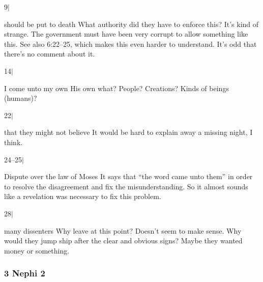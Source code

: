 		\begin{compactdesc}
		
		\item[9$\vert$]
		\begin{compactdesc}
		\item[should be put to death] What authority did they have to enforce this? It's kind of strange. The government must have been very corrupt to allow something like this. See also 6:22--25, which makes this even harder to understand. It's odd that there's no comment about it.
		\end{compactdesc}
		
		\item[14$\vert$]
		\begin{compactdesc}
		\item[I come unto my own] His own what? People? Creations? Kinds of beings (humans)?
		\end{compactdesc}
		
		\item[22$\vert$]
		\begin{compactdesc}
		\item[that they might not believe] It would be hard to explain away a missing night, I think. 
		\end{compactdesc}
		
		\item[24--25$\vert$]
		\begin{compactdesc}
		\item[Dispute over the law of Moses] It says that ``the word came unto them'' in order to resolve the disagreement and fix the misunderstanding. So it almost sounds like a revelation was necessary to fix this problem. 
		\end{compactdesc}
		
		\item[28$\vert$]
		\begin{compactdesc}
		\item[many dissenters] Why leave at this point? Doesn't seem to make sense. Why would they jump ship after the clear and obvious signs? Maybe they wanted money or something.
		\end{compactdesc}
		
		\end{compactdesc}
		
	\subsubsection{3 Nephi 2} %

